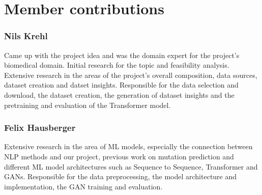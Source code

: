 \section*{Member contributions}

\subsubsection*{Nils Krehl}

Came up with the project idea and was the domain expert for the project's biomedical domain. Initial research for the topic and feasibility analysis.
Extensive research in the areas of the project's overall composition, data sources, dataset creation and datset insights.
Responsible for the data selection and download, the dataset creation, the generation of dataset insights and the pretraining and evaluation of the Transformer model.

\subsubsection*{Felix Hausberger}

Extensive research in the area of ML models, especially the connection between NLP methods and our project, previous work on mutation prediction and different ML model architectures such as Sequence to Sequence, Transformer and GANs.
Responsible for the data preprocessing, the model architecture and implementation, the GAN training and evaluation.